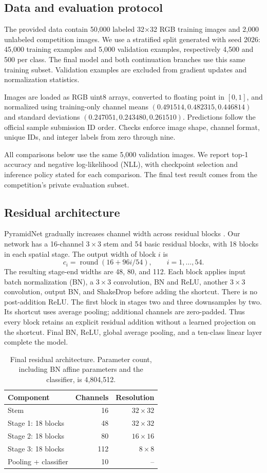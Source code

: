 \documentclass[letterpaper]{article}
\begin{document}
\subsection{Data and evaluation protocol}
The provided data contain 50,000 labeled 32$\times$32 RGB training images and 2,000 unlabeled competition images. We use a stratified split generated with seed 2026: 45,000 training examples and 5,000 validation examples, respectively 4,500 and 500 per class. The final model and both continuation branches use this same training subset. Validation examples are excluded from gradient updates and normalization statistics.

Images are loaded as RGB uint8 arrays, converted to floating point in $[0,1]$, and normalized using training-only channel means $(0.491514,0.482315,0.446814)$ and standard deviations $(0.247051,0.243480,0.261510)$. Predictions follow the official sample submission ID order. Checks enforce image shape, channel format, unique IDs, and integer labels from zero through nine.

All comparisons below use the same 5,000 validation images. We report top-1 accuracy and negative log-likelihood (NLL), with checkpoint selection and inference policy stated for each comparison. The final test result comes from the competition's private evaluation subset.

\subsection{Residual architecture}
PyramidNet gradually increases channel width across residual blocks \citep{han2017pyramid}. Our network has a 16-channel $3\times3$ stem and 54 basic residual blocks, with 18 blocks in each spatial stage. The output width of block $i$ is
\[
 c_i=\operatorname{round}(16+96i/54),\qquad i=1,\ldots,54.
\]
The resulting stage-end widths are 48, 80, and 112. Each block applies input batch normalization (BN), a $3\times3$ convolution, BN and ReLU, another $3\times3$ convolution, output BN, and ShakeDrop before adding the shortcut. There is no post-addition ReLU. The first block in stages two and three downsamples by two. Its shortcut uses average pooling; additional channels are zero-padded. Thus every block retains an explicit residual addition without a learned projection on the shortcut. Final BN, ReLU, global average pooling, and a ten-class linear layer complete the model.

\begin{table}[t]
\centering
\begin{tabular}{lrr}
\hline
Component & Channels & Resolution\\\hline
Stem &16&$32\times32$\\
Stage 1: 18 blocks&48&$32\times32$\\
Stage 2: 18 blocks&80&$16\times16$\\
Stage 3: 18 blocks&112&$8\times8$\\
Pooling + classifier&10&--\\\hline
\end{tabular}
\caption{Final residual architecture. Parameter count, including BN affine parameters and the classifier, is 4,804,512.}
\end{table}
\end{document}
